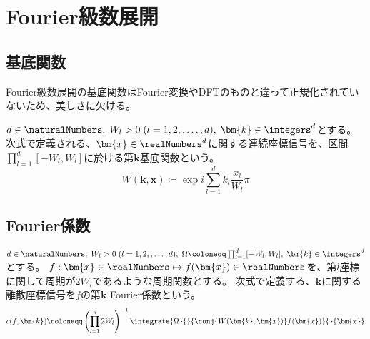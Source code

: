 \chapter{Fourier級数展開}
    \section{基底関数}
        Fourier級数展開の基底関数はFourier変換やDFTのものと違って正規化されていないため、美しさに欠ける。
        \par
        $d\in\naturalNumbers,\;W_l>0\;(l=1,2,,\dots,d),\;\bm{k}\in\integers^d$とする。
        次式で定義される、$\bm{x}\in\realNumbers^d$に関する連続座標信号を、区間$\prod_{l=1}^d [-W_l,W_l]$に於ける第$\bm{k}$基底関数という。
        \[ W(\bm{k},\bm{x}) \coloneqq \exp i\sum_{l=1}^d k_l\frac{x_l}{W_l}\pi \]

    \section{Fourier係数}
        $d\in\naturalNumbers,\;W_l>0\;(l=1,2,,\dots,d),\;\Omega\coloneqq\prod_{l=1}^d [-W_l,W_l],\;\bm{k}\in\integers^d$とする。
        $f:\bm{x}\in\realNumbers \mapsto f(\bm{x})\in\realNumbers$を、第$l$座標に関して周期が$2W_l$であるような周期関数とする。
        次式で定義する、$\bm{k}$に関する離散座標信号を$f$の第$\bm{k}$ Fourier係数という。
        \[ c(f,\bm{k}) \coloneqq \left(\prod_{l=1}^d 2W_l\right)^{-1}\integrate{\Omega}{}{\conj{W(\bm{k},\bm{x})}f(\bm{x})}{}{\bm{x}} \]